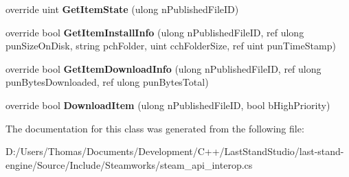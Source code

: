 \begin{DoxyCompactItemize}
\item 
\hypertarget{classValve_1_1Steamworks_1_1CSteamUGC_aa3f2b7f435f170c6f6d52bae425be979}{}override uint {\bfseries Get\+Item\+State} (ulong n\+Published\+File\+I\+D)\label{classValve_1_1Steamworks_1_1CSteamUGC_aa3f2b7f435f170c6f6d52bae425be979}

\item 
\hypertarget{classValve_1_1Steamworks_1_1CSteamUGC_ab6e2cbe332872b01cad8cd0b34671c0b}{}override bool {\bfseries Get\+Item\+Install\+Info} (ulong n\+Published\+File\+I\+D, ref ulong pun\+Size\+On\+Disk, string pch\+Folder, uint cch\+Folder\+Size, ref uint pun\+Time\+Stamp)\label{classValve_1_1Steamworks_1_1CSteamUGC_ab6e2cbe332872b01cad8cd0b34671c0b}

\item 
\hypertarget{classValve_1_1Steamworks_1_1CSteamUGC_a9aafe9e03b4fa69f3c82f12f1f8c587e}{}override bool {\bfseries Get\+Item\+Download\+Info} (ulong n\+Published\+File\+I\+D, ref ulong pun\+Bytes\+Downloaded, ref ulong pun\+Bytes\+Total)\label{classValve_1_1Steamworks_1_1CSteamUGC_a9aafe9e03b4fa69f3c82f12f1f8c587e}

\item 
\hypertarget{classValve_1_1Steamworks_1_1CSteamUGC_a60502585b271c8cf3fb1aa0d1c0fa8d1}{}override bool {\bfseries Download\+Item} (ulong n\+Published\+File\+I\+D, bool b\+High\+Priority)\label{classValve_1_1Steamworks_1_1CSteamUGC_a60502585b271c8cf3fb1aa0d1c0fa8d1}

\end{DoxyCompactItemize}


The documentation for this class was generated from the following file\+:\begin{DoxyCompactItemize}
\item 
D\+:/\+Users/\+Thomas/\+Documents/\+Development/\+C++/\+Last\+Stand\+Studio/last-\/stand-\/engine/\+Source/\+Include/\+Steamworks/steam\+\_\+api\+\_\+interop.\+cs\end{DoxyCompactItemize}
